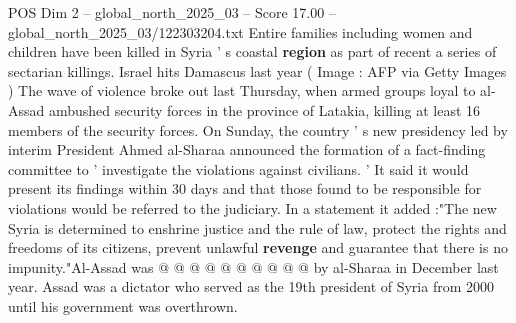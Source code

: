 \begin{textsample}{POS Dim 2 – global\_north\_2025\_03 – Score 17.00 – global\_north\_2025\_03/122303204.txt}
Entire families including women and children have been killed in Syria ' s coastal \textbf{region} as part of recent a series of sectarian killings.
Israel hits Damascus last year ( Image : AFP via Getty Images ) The wave of violence broke out last Thursday, when armed groups loyal to al-Assad ambushed security forces in the province of Latakia, killing at least 16 members of the security forces.
On Sunday, the country ' s new presidency led by interim President Ahmed al-Sharaa announced the formation of a fact-finding committee to ' investigate the violations against civilians. ' It said it would present its findings within 30 days and that those found to be responsible for violations would be referred to the judiciary.
In a statement it added :"The new Syria is determined to enshrine justice and the rule of law, protect the rights and freedoms of its citizens, prevent unlawful \textbf{revenge} and guarantee that there is no impunity."Al-Assad was @ @ @ @ @ @ @ @ @ @ by al-Sharaa in December last year.
Assad was a dictator who served as the 19th president of Syria from 2000 until his government was overthrown.

\end{textsample}
